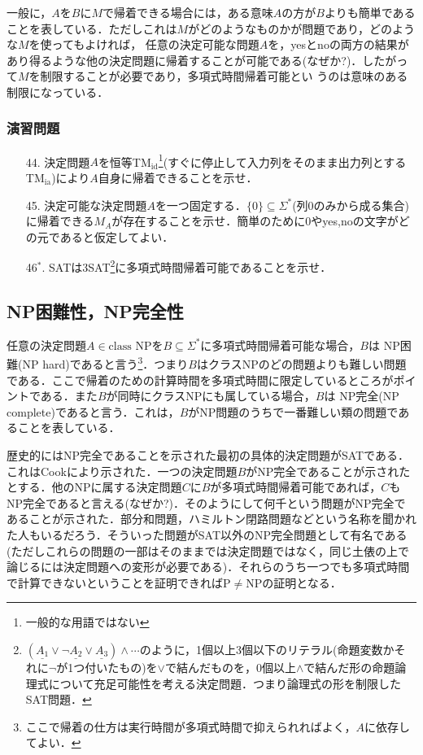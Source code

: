 \documentclass{ltjsarticle}
\theoremstyle{mystyle1}
\theoremstyle{mystyle2}
\newcommand{\red}[1]{{\color{red} #1}}
\begin{document}
一般に，$A$を$B$に$M$で帰着できる場合には，ある意味$A$の方が$B$よりも簡単であることを表している．ただしこれは$M$がどのようなものかが問題であり，どのような$M$を使ってもよければ， 任意の決定可能な問題$A$を，yesとnoの両方の結果があり得るような他の決定問題に帰着することが可能である(なぜか?)．したがって$M$を制限することが必要であり，多項式時間帰着可能とい うのは意味のある制限になっている．
\subsubsection*{演習問題}
\begin{enumerate}
  \item[44.] 決定問題$A$を恒等TM$_\text{id}$\footnote{一般的な用語ではない}(すぐに停止して入力列をそのまま出力列とするTM$_\text{ia}$)により$A$自身に帰着できることを示せ．
  \item[45.] 決定可能な決定問題$A$を一つ固定する．$\{0\}\subseteq\Sigma^\ast$(列0のみから成る集合)に帰着できる$M_A$が存在することを示せ．簡単のために0やyes,noの文字がどの元であると仮定してよい．
  \item[46$^\ast$.] SATは3SAT\footnote{$\left(\underline{A_1}\vee\neg\underline{A_2}\vee\underline{A_3}\right)\wedge\cdots$のように，1個以上3個以下のリテラル(命題変数かそれに$\neg$が1つ付いたもの)を$\vee$で結んだものを，0個以上$\wedge$で結んだ形の命題論理式について充足可能性を考える決定問題．つまり論理式の形を制限したSAT問題．}に多項式時間帰着可能であることを示せ．
\end{enumerate}
\subsection{NP困難性，NP完全性}\label{sec:NP}
任意の決定問題$A\in\text{class NP}$を$B\subseteq\Sigma^\ast$に多項式時間帰着可能な場合，$B$は\red{NP困難}(NP hard)であると言う\footnote{ここで帰着の仕方は実行時間が多項式時間で抑えられればよく，$A$に依存してよい．}．つまり$B$はクラスNPのどの問題よりも難しい問題である．ここで帰着のための計算時間を多項式時間に限定しているところがポイントである．また$B$が同時にクラスNPにも属している場合，$B$は\red{NP完全}(NP complete)であると言う．これは，$B$がNP問題のうちで一番難しい類の問題であることを表している．

歴史的にはNP完全であることを示された最初の具体的決定問題がSATである．これはCookにより示された．一つの決定問題$B$がNP完全であることが示されたとする．他のNPに属する決定問題$C$に$B$が多項式時間帰着可能であれば，$C$もNP完全であると言える(なぜか?)．そのようにして何千という問題がNP完全であることが示された．部分和問題，ハミルトン閉路問題などという名称を聞かれた人もいるだろう．そういった問題がSAT以外のNP完全問題として有名である(ただしこれらの問題の一部はそのままでは決定問題ではなく，同じ土俵の上で論じるには決定問題への変形が必要である)．それらのうち一つでも多項式時間で計算できないということを証明できればP$\neq$NPの証明となる．
\end{document}
